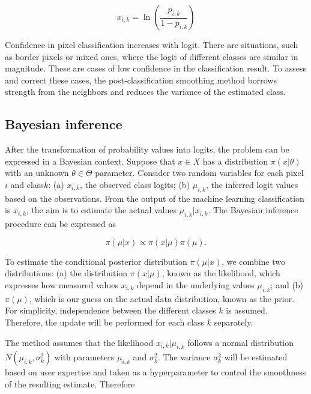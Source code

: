 \documentclass[
]{jss}
\begin{document}
\begin{equation}
x_{i,k} = \ln \left(\frac{p_{i,k}}{1 - p_{i,k}}\right)
\end{equation}

Confidence in pixel classification increases with logit. There are situations, such as
border pixels or mixed ones, where the logit of different classes are similar in magnitude.
These are cases of low confidence in the classification result. To assess and correct these
cases, the post-classification smoothing method borrows strength from the neighbors and
reduces the variance of the estimated class.

\hypertarget{bayesian-inference}{%
\subsection{Bayesian inference}\label{bayesian-inference}}

After the transformation of probability values into logits, the problem can be expressed
in a Bayesian context. Suppose that \(x\in{}X\) has a distribution
\(\pi(x|\theta)\) with an unknown \(\theta{}\in{}\Theta{}\) parameter. Consider two random
variables for each pixel \(i\) and class\(k\): (a) \(x_{i,k}\), the observed class logits;
(b) \(\mu_{i,k}\), the inferred logit values based on the observations. From the output of
the machine learning classification is \(x_{i,k}\), the aim is to estimate the actual
values \(\mu_{i,k} | x_{i,k}\). The Bayesian inference procedure can be expressed as

\begin{equation}
\pi(\mu|x) \propto{} \pi(x|\mu)\pi(\mu).
\end{equation}

To estimate the conditional posterior distribution \(\pi(\mu|x)\), we combine two
distributions: (a) the distribution \(\pi(x|\mu)\), known as the likelihood,
which expresses how measured values \(x_{i,k}\) depend in the underlying values \(\mu_{i,k}\);
and (b) \(\pi(\mu)\), which is our guess on the actual data distribution, known as the prior.
For simplicity, independence between the different classes \(k\) is assumed. Therefore, the
update will be performed for each class \(k\) separately.

The method assumes that the likelihood \(x_{i,k} | \mu_{i,k}\) follows a normal
distribution \(N(\mu_{i,k}, \sigma^2_{k})\) with parameters \(\mu_{i,k}\) and \(\sigma^2_{k}\).
The variance \(\sigma^2_{k}\) will be estimated based on user expertise and taken as
a hyperparameter to control the smoothness of the resulting estimate. Therefore
\end{document}
